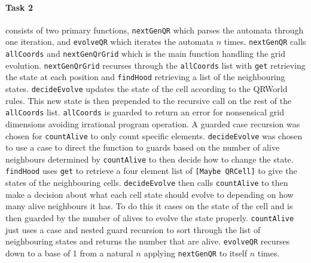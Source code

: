 \documentclass[11pt]{article}
\begin{document}
\paragraph{Task 2} consists of two primary functions, \verb|nextGenQR| which parses the automata through one iteration, and \verb|evolveQR| which iterates the automata $n$ times. \verb|nextGenQR| calls  \verb|allCoords| and \verb|nextGenQrGrid| which is the main function handling the grid evolution. \verb|nextGenQrGrid| recurses through the \verb|allCoords| list with  \verb|get| retrieving the state at each position and \verb|findHood| retrieving a list of the neighbouring states.  \verb|decideEvolve| updates the state of the cell according to the QRWorld rules. This new state is then prepended to the recursive call on the rest of the \verb|allCoords| list.  \verb|allCoords| is guarded to return an error for nonsensical grid dimensions avoiding irrational program operation. A guarded case recursion was chosen for \verb|countAlive| to only count specific elements. \verb|decideEvolve| was chosen to use a case to direct the function to guards based on the number of alive neighbours determined by \verb|countAlive| to then decide how to change  the state. \verb|findHood| uses \verb|get| to retrieve a four element list of \verb|[Maybe QRCell]| to give the states of the neighbouring cells. \verb|decideEvolve| then calls \verb|countAlive| to then make a decision about what each cell state should evolve to depending on how many alive neighbours it has. To do this it cases on the state of the cell and is then guarded by the number of alives to evolve the state properly. \verb|countAlive| just uses a case and nested guard recursion to sort through the list of neighbouring states and returns the number that are alive. \verb|evolveQR| recurses down to a base of 1 from a natural $n$ applying \verb|nextGenQR| to itself $n$ times.

\newpage
\end{document}
